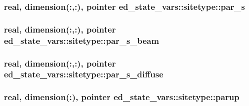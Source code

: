 \subsubsection[{\texorpdfstring{par\+\_\+s}{par_s}}]{\setlength{\rightskip}{0pt plus 5cm}real, dimension(\+:,\+:), pointer ed\+\_\+state\+\_\+vars\+::sitetype\+::par\+\_\+s}\hypertarget{structed__state__vars_1_1sitetype_adbfa29081f67f5ec6b7206aed85900f6}{}\label{structed__state__vars_1_1sitetype_adbfa29081f67f5ec6b7206aed85900f6}
\subsubsection[{\texorpdfstring{par\+\_\+s\+\_\+beam}{par_s_beam}}]{\setlength{\rightskip}{0pt plus 5cm}real, dimension(\+:,\+:), pointer ed\+\_\+state\+\_\+vars\+::sitetype\+::par\+\_\+s\+\_\+beam}\hypertarget{structed__state__vars_1_1sitetype_af04a6b6bb015712d0531af02b62548f6}{}\label{structed__state__vars_1_1sitetype_af04a6b6bb015712d0531af02b62548f6}
\subsubsection[{\texorpdfstring{par\+\_\+s\+\_\+diffuse}{par_s_diffuse}}]{\setlength{\rightskip}{0pt plus 5cm}real, dimension(\+:,\+:), pointer ed\+\_\+state\+\_\+vars\+::sitetype\+::par\+\_\+s\+\_\+diffuse}\hypertarget{structed__state__vars_1_1sitetype_a2644ff64523223cfc305a326d97332e2}{}\label{structed__state__vars_1_1sitetype_a2644ff64523223cfc305a326d97332e2}
\subsubsection[{\texorpdfstring{parup}{parup}}]{\setlength{\rightskip}{0pt plus 5cm}real, dimension(\+:), pointer ed\+\_\+state\+\_\+vars\+::sitetype\+::parup}\hypertarget{structed__state__vars_1_1sitetype_ace7651fbb96da7fc950264c95ce7e267}{}\label{structed__state__vars_1_1sitetype_ace7651fbb96da7fc950264c95ce7e267}

